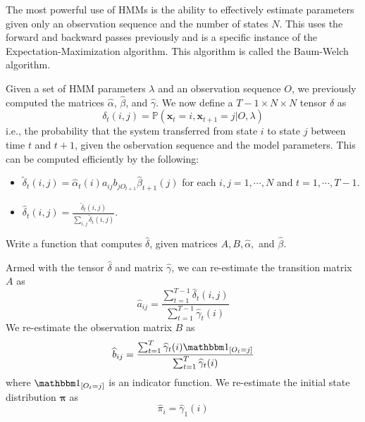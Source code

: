 

The most powerful use of HMMs is the ability to effectively estimate parameters given only an observation sequence and the number of states $N$. This uses the forward and backward passes previously and is a specific instance of the Expectation-Maximization algorithm. This algorithm is called the Baum-Welch algorithm.

Given a set of HMM parameters $\lambda$ and an observation sequence $O$, we previously computed the matrices $\widehat{\alpha}$, $\widehat{\beta}$, and $\widehat{\gamma}$. We now define a $T-1 \times N \times N$ tensor $\delta$ as 
\begin{equation*}
\delta_{t}(i,j) = \mathbb{P}(\mathbf{x}_{t} = i, \mathbf{x}_{t+1} = j | O, \lambda)
\end{equation*}
i.e., the probability that the system transferred from state $i$ to state $j$ between time $t$ and $t+1$, given the osbervation sequence and the model parameters. This can be computed efficiently by the following:
\begin{itemize}
 \item $\tilde{\delta}_{t}(i,j) = \widehat{\alpha}_{t}(i)a_{ij} b_{jO_{t+1}} \widehat{\beta}_{t+1}(j)$ for each $i,j = 1, \cdots, N$ and $t = 1, \cdots, T-1$.
 \item $\widehat{\delta}_{t}(i,j) = \frac{\tilde{\delta}_{t}(i,j)}{\sum_{i,j} \tilde{\delta}_{t}(i,j)}$.
\end{itemize}

\begin{problem}
Write a function that computes $\widehat{\delta}$, given matrices $A, B, \widehat{\alpha},$ and $\widehat{\beta}$.
\end{problem}

Armed with the tensor $\widehat{\delta}$ and matrix $\widehat{\gamma}$, we can re-estimate the transition matrix $A$ as
\begin{equation*}
\widehat{a}_{ij} = \frac{\sum_{t=1}^{T-1}\widehat{\delta}_{t}(i,j)}{\sum_{t=1}^{T-1}\widehat{\gamma}_{t}(i)}
\end{equation*}
We re-estimate the observation matrix $B$ as 
\begin{equation*}
\widehat{b}_{ij} = 
\frac{\sum_{t=1}^{T} \widehat{\gamma}_{t}(i) \indicator{O_{t} = j}} {\sum_{t=1}^{T} \widehat{\gamma}_{t}(i)}
\end{equation*}
where $\indicator{O_{t} = j}$ is an indicator function. We re-estimate the initial state distribution $\mathbf{\pi}$ as 
\begin{equation*}
\widehat{\pi}_{i} = \widehat{\gamma}_{1}(i)
\end{equation*}

